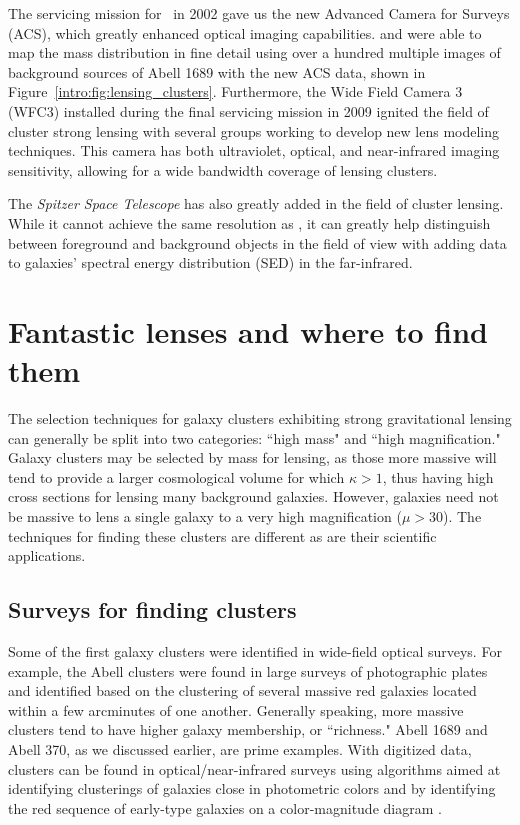 The servicing mission for \hst\ in 2002 gave us the new Advanced Camera for Surveys (ACS), which greatly enhanced optical imaging capabilities. \citet{Broadhurst:2005qy} and \citet{Halkola:2006ss} were able to map the mass distribution in fine detail using over a hundred multiple images of background sources of Abell 1689 with the new ACS data, shown in Figure~\ref{intro:fig:lensing_clusters}. Furthermore, the Wide Field Camera 3 (WFC3) installed during the final servicing mission in 2009 ignited the field of cluster strong lensing with several groups working to develop new lens modeling techniques. This camera has both ultraviolet, optical, and near-infrared imaging sensitivity, allowing for a wide bandwidth coverage of lensing clusters.

The {\it Spitzer Space Telescope} has also greatly added in the field of cluster lensing. While it cannot achieve the same resolution as \hst, it can greatly help distinguish between foreground and background objects in the field of view with adding data to galaxies' spectral energy distribution (SED) in the far-infrared.

\section{Fantastic lenses and where to find them}

The selection techniques for galaxy clusters exhibiting strong gravitational lensing can generally be split into two categories: ``high mass" and ``high magnification." Galaxy clusters may be selected by mass for lensing, as those more massive will tend to provide a larger cosmological volume for which $\kappa>1$, thus having high cross sections for lensing many background galaxies. However, galaxies need not be massive to lens a single galaxy to a very high magnification ($\mu>30$). The techniques for finding these clusters are different as are their scientific applications.

\subsection{Surveys for finding clusters}

Some of the first galaxy clusters were identified in wide-field optical surveys. For example, the Abell clusters \citep{Abell:1958mz,Zwicky:1968rm,Abell:1989ly} were found in large surveys of photographic plates and identified based on the clustering of several massive red galaxies located within a few arcminutes of one another. Generally speaking, more massive clusters tend to have higher galaxy membership, or ``richness." Abell 1689 and Abell 370, as we discussed earlier, are prime examples. With digitized data, clusters can be found in optical/near-infrared surveys using algorithms aimed at identifying clusterings of galaxies close in photometric colors and by identifying the red sequence of early-type galaxies on a color-magnitude diagram \citep{Rykoff:2014rz,Gladders:2000kq}.

